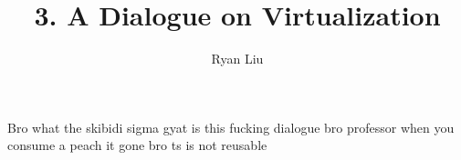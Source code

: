 \documentclass{article}
\title{3. A Dialogue on Virtualization}
\author{Ryan Liu}
\begin{document}
\maketitle
\thispagestyle{empty}
\newpage
{}

\setcounter{section}{3}

Bro what the skibidi sigma gyat is this fucking dialogue bro professor when you consume a peach it gone bro ts is not reusable
\end{document}
